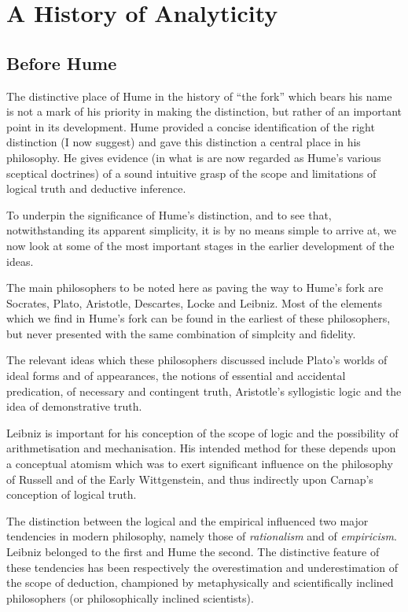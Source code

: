 
\chapter{A History of Analyticity}

\section{Before Hume}\label{Before}

The distinctive place of Hume in the history of ``the fork'' which
bears his name is not a mark of his priority in making the
distinction, but rather of an important point in its development.
Hume provided a concise identification of the right distinction (I now suggest)
and gave this distinction a central place in his philosophy.
He gives evidence (in what is are now regarded as Hume's various
sceptical doctrines) of a sound intuitive grasp of the scope and
limitations of logical truth and deductive inference.

To underpin the significance of Hume's distinction, and to see that,
notwithstanding its apparent simplicity, it is by no means simple to
arrive at, we now look at some of the most important stages in the
earlier development of the ideas.

The main philosophers to be noted here as paving the way to Hume's fork are Socrates, Plato, Aristotle, Descartes, Locke and Leibniz.
Most of the elements which we find in Hume's fork can be found in the
earliest of these philosophers, but never presented with the same combination of simplcity and fidelity.

The relevant ideas which these philosophers discussed include Plato's worlds of ideal forms and of appearances, the notions of essential and accidental predication, of necessary and contingent truth, Aristotle's syllogistic logic and the idea of demonstrative truth.

Leibniz is important for his conception of the scope of logic and the possibility of arithmetisation and mechanisation.
His intended method for these depends upon a conceptual atomism which was to exert significant influence on the philosophy of Russell and of the Early Wittgenstein, and thus indirectly upon Carnap's conception of logical truth.

The distinction between the logical and the empirical influenced two major tendencies in modern philosophy, namely those of \emph{rationalism} and of
\emph{empiricism}.
Leibniz belonged to the first and Hume the second.
The distinctive feature of these tendencies has been respectively the overestimation and underestimation of the scope of deduction, championed by metaphysically and scientifically inclined philosophers (or philosophically inclined scientists).

